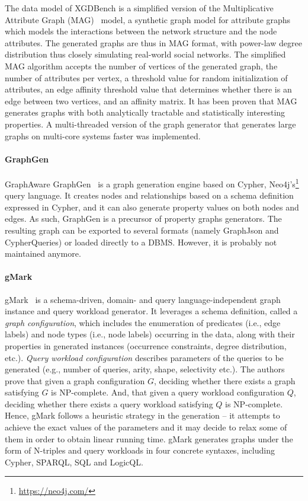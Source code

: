 The data model of XGDBench is a simplified version of the Multiplicative Attribute Graph (MAG)~\cite{Kim2010} model, a synthetic graph model for attribute graphs which models the interactions between the network structure and the node attributes. 
The generated graphs are thus in MAG format, with power-law degree distribution thus closely simulating real-world social networks.
The simplified MAG algorithm accepts the number of vertices of the generated graph, the number of attributes per vertex, a threshold value for random initialization of attributes, an edge affinity threshold value that determines whether there is an edge between two vertices, and an affinity matrix. It has been proven that MAG generates graphs with both analytically tractable and statistically interesting properties. A multi-threaded version of the graph generator that generates large graphs on multi-core systems faster was implemented.


\paragraph{GraphGen}  GraphAware GraphGen~\cite{GraphGen} is a graph generation engine based on Cypher, Neo4j's\footnote{\url{https://neo4j.com/}} query language.  It creates nodes and relationships based on a schema definition expressed in Cypher, and it can also generate property values on both 
nodes and edges. As such, GraphGen is a precursor of property graphs generators. The resulting graph can be exported to several formats (namely GraphJson and CypherQueries) or loaded directly to a DBMS. However, it is probably not maintained anymore.


\paragraph{gMark}  gMark~\cite{gMark} is a schema-driven, domain- and query language-independent graph instance and query workload generator.  It leverages a schema definition,
called a \emph{graph configuration}, which includes the enumeration of predicates (i.e., edge labels) and node types (i.e., node labels) occurring in the data, along with their properties in generated instances (occurrence constraints, degree distribution, etc.). \emph{Query workload configuration}  describes parameters of the queries to be generated (e.g., number of queries, arity, shape, selectivity etc.). The authors prove that given a graph configuration $G$, deciding whether there exists a graph satisfying $G$ is NP-complete. And, that given a query workload configuration $Q$, deciding
whether there exists a query workload satisfying $Q$ is NP-complete. Hence, gMark follows a heuristic strategy in the generation -- it attempts to achieve the exact values of the parameters and it may decide to relax some of them in order to obtain linear running time. gMark generates graphs under the form of N-triples and query workloads in four concrete syntaxes, including Cypher, SPARQL, SQL and LogicQL. 